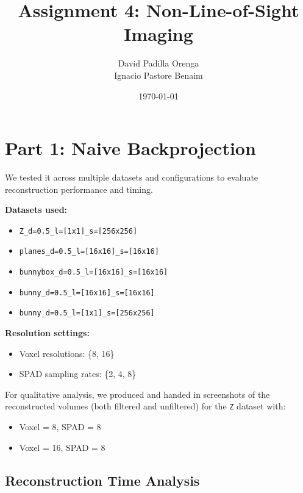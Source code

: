 \documentclass[a4paper,10pt]{article}
\title{Assignment 4: Non-Line-of-Sight Imaging}
\author{David Padilla Orenga \\ Ignacio Pastore Benaim}
\date{\today}
\begin{document}
\maketitle
\thispagestyle{empty}

\section{Part 1: Naive Backprojection}

We tested it across multiple datasets and configurations to evaluate reconstruction performance and timing.

\vspace{1em}
\textbf{Datasets used:}
\begin{itemize}
    \item \texttt{Z\_d=0.5\_l=[1x1]\_s=[256x256]}
    \item \texttt{planes\_d=0.5\_l=[16x16]\_s=[16x16]}
    \item \texttt{bunnybox\_d=0.5\_l=[16x16]\_s=[16x16]}
    \item \texttt{bunny\_d=0.5\_l=[16x16]\_s=[16x16]}
    \item \texttt{bunny\_d=0.5\_l=[1x1]\_s=[256x256]}
\end{itemize}

\vspace{1em}
\textbf{Resolution settings:}
\begin{itemize}
    \item Voxel resolutions: \{8, 16\}
    \item SPAD sampling rates: \{2, 4, 8\}
\end{itemize}

For qualitative analysis, we produced and handed in screenshots of the reconstructed volumes (both filtered and unfiltered) for the \texttt{Z} dataset with:
\begin{itemize}
    \item Voxel = 8, SPAD = 8
    \item Voxel = 16, SPAD = 8
\end{itemize}

\subsection*{Reconstruction Time Analysis}
\end{document}
